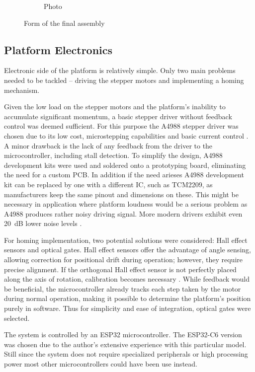 \begin{figure}[h!]
\begin{subfigure}[b]{0.45\textwidth}
    \caption{Photo}
  \end{subfigure}
  \caption{Form of the final assembly}
  \label{fig:side_by_side}
\end{figure}


\subsection{Platform Electronics}

Electronic side of the platform is relatively simple.
Only two main problems needed to be tackled -- driving the stepper motors and implementing a homing mechanism.

Given the low load on the stepper motors and the platform's inability to accumulate significant momentum, a basic stepper driver without feedback control was deemed sufficient.
For this purpose the A4988 stepper driver was chosen due to its low cost, microstepping capabilities and basic current control \cite{a4988}.
A minor drawback is the lack of any feedback from the driver to the microcontroller, including stall detection.
To simplify the design, A4988 development kits were used and soldered onto a prototyping board, eliminating the need for a custom PCB.
In addition if the need arieses A4988 development kit can be replaced by one with a different IC, such as TCM2209, as manufacturers keep the same pinout and dimensions on these.
This might be necessary in application where platform loudness would be a serious problem as A4988 produces rather noisy driving signal.
More modern drivers exhibit even 20~dB lower noise levels \cite{a4988_sound}.

For homing implementation, two potential solutions were considered: Hall effect sensors and optical gates.
Hall effect sensors offer the advantage of angle sensing, allowing correction for positional drift during operation; however, they require precise alignment.
If the orthogonal Hall effect sensor is not perfectly placed along the axis of rotation, calibration becomes necessary \cite{hall}.
While feedback would be beneficial, the microcontroller already tracks each step taken by the motor during normal operation, making it possible to determine the platform's position purely in software.
Thus for simplicity and ease of integration, optical gates were selected.

The system is controlled by an ESP32 microcontroller.
The ESP32-C6 version was chosen due to the author's extensive experience with this particular model.
Still since the system does not require specialized peripherals or high processing power most other microcontrollers could have been use instead.

